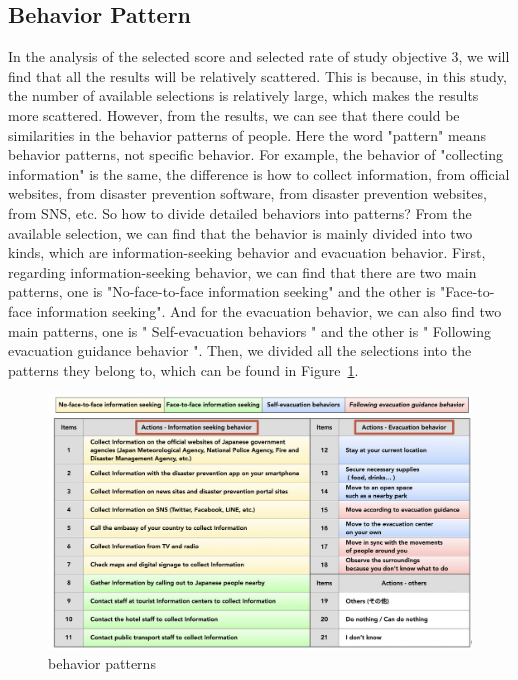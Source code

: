 \subsection{Behavior Pattern}

In the analysis of the selected score and selected rate of study objective 3, we will find that all the results will be relatively scattered. This is because, in this study, the number of available selections is relatively large, which makes the results more scattered. However, from the results, we can see that there could be similarities in the behavior patterns of people. Here the word "pattern" means behavior patterns, not specific behavior. For example, the behavior of  "collecting information" is the same, the difference is how to collect information, from official websites, from disaster prevention software, from disaster prevention websites, from SNS, etc. So how to divide detailed behaviors into patterns? From the available selection, we can find that the behavior is mainly divided into two kinds, which are information-seeking behavior and evacuation behavior. First, regarding information-seeking behavior, we can find that there are two main patterns, one is "No-face-to-face information seeking" and the other is "Face-to-face information seeking". And for the evacuation behavior, we can also find two main patterns, one is " Self-evacuation behaviors " and the other is " Following evacuation guidance behavior ". Then, we divided all the selections into the patterns they belong to, which can be found in Figure~\ref{fig12}.

\begin{figure}[h]
  \includegraphics[width=\linewidth]{Figure/Figure12.png}
  \centering
  \caption{behavior patterns}
  \label{fig12}
\end{figure}

